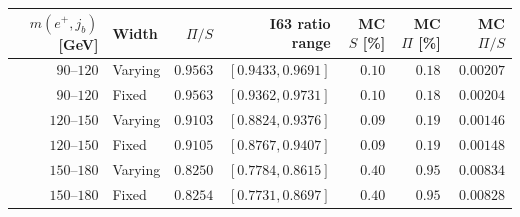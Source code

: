 \begin{tabular}{rlrrrrr}
\toprule
$m(e^+,j_b)$ [GeV] & Width & $\Pi/S$ & I63 ratio range & MC $S$ [\%] & MC $\Pi$ [\%] & MC $\Pi/S$ \\
\midrule
$90$--$120$ & Varying & $0.9563$ & $[0.9433,0.9691]$ & $0.10$ & $0.18$ & $0.00207$ \\
$90$--$120$ & Fixed & $0.9563$ & $[0.9362,0.9731]$ & $0.10$ & $0.18$ & $0.00204$ \\
$120$--$150$ & Varying & $0.9103$ & $[0.8824,0.9376]$ & $0.09$ & $0.19$ & $0.00146$ \\
$120$--$150$ & Fixed & $0.9105$ & $[0.8767,0.9407]$ & $0.09$ & $0.19$ & $0.00148$ \\
$150$--$180$ & Varying & $0.8250$ & $[0.7784,0.8615]$ & $0.40$ & $0.95$ & $0.00834$ \\
$150$--$180$ & Fixed & $0.8254$ & $[0.7731,0.8697]$ & $0.40$ & $0.95$ & $0.00828$ \\
\bottomrule
\end{tabular}
